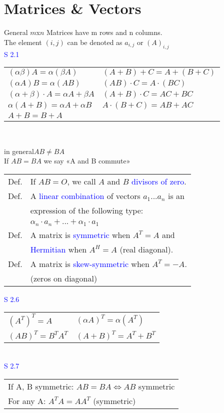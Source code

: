 \section{Matrices \& Vectors}
\begin{mainbox}{General}
$m$x$n$ Matrices have m rows and n columns.\\
The element $(i,j)$ can be denoted as $a_{i,j}$ or $(A)_{i,j}$\\
\textcolor{blue}{S 2.1}\\
\begin{tabular}{ll}
	$(\alpha\beta)A = \alpha(\beta A)$ & $(A+B)+C = A+(B+C)$ \\
	$(\alpha A)B = \alpha(AB)$ & $(AB)\cdot C = A\cdot (BC)$ \\
	$(\alpha + \beta)\cdot A = \alpha A + \beta A$ & $(A+B)\cdot C = AC + BC$ \\
	$\alpha (A+B) = \alpha A + \alpha B$ & $A\cdot (B+C) = AB+AC$ \\
	$A+B = B+A$ & \\
\end{tabular}\\
{\par\centering\danger in general$AB \neq BA$\\
If $AB = BA$ we say «A and B commute»\par}
\medskip

\begin{tabular}{ll}
	Def. & If $AB = O$, we call $A$ and $B$ \textcolor{blue}{divisors of zero}.\\
	Def. & A \textcolor{blue}{linear combination} of vectors $a_1 ... a_n$ is an\\
 	& expression of the following type:\\
 	& $\alpha_n\cdot a_n + ... + \alpha_1\cdot a_1$\\
	Def. & A matrix is \textcolor{blue}{symmetric} when $A^T = A$ and \\
	&  \textcolor{blue}{Hermitian} when $A^H = A$ (real diagonal).\\
	Def. & A matrix is \textcolor{blue}{skew-symmetric} when $A^T = -A$.\\
	& (zeros on diagonal) \\
\end{tabular}
\textcolor{blue}{S 2.6}\\
\begin{tabular}{ll}
	$(A^T)^T = A$ & $(\alpha A)^T = \alpha(A^T)$ \\
	$(AB)^T = B^TA^T$ & $(A+B)^T = A^T + B^T$ \\
\end{tabular}\\
\textcolor{blue}{S 2.7}\\
\begin{tabular}{l}
	If A, B symmetric: $AB = BA \Leftrightarrow AB$ symmetric\\
	For any A: $A^TA = AA^T$ (symmetric)\\
\end{tabular}


\end{mainbox}